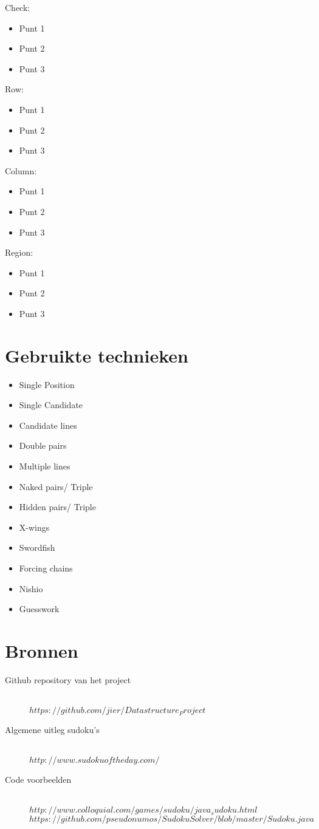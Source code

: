 \documentclass{article}
\begin{document}
Check:
\begin{itemize}
    \item Punt 1
    \item Punt 2
    \item Punt 3
\end{itemize}
Row:
\begin{itemize}
    \item Punt 1
    \item Punt 2
    \item Punt 3
\end{itemize}
Column:
\begin{itemize}
    \item Punt 1
    \item Punt 2
    \item Punt 3
\end{itemize}
Region:
\begin{itemize}
    \item Punt 1
    \item Punt 2
    \item Punt 3
\end{itemize}
\section{Gebruikte technieken}
\begin{itemize}
    \item Single Position
    \item Single Candidate
    \item Candidate lines
    \item Double pairs
    \item Multiple lines
    \item Naked pairs/ Triple
    \item Hidden pairs/ Triple
    \item X-wings
    \item Swordfish
    \item Forcing chains
    \item Nishio
    \item Guesswork
\end{itemize}

\section{Bronnen}
\begin{description}
    \item[Github repository van het project] \hfill \\
    $https://github.com/jier/Datastructure_Project$
    \item[Algemene uitleg sudoku's] \hfill \\
   $http://www.sudokuoftheday.com/$
    \item[Code voorbeelden] \hfill \\
   $http://www.colloquial.com/games/sudoku/java_sudoku.html$ \\
   $https://github.com/pseudonumos/SudokuSolver/blob/master/Sudoku.java$
\end{description}
\end{document}
